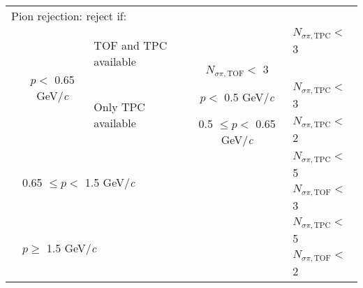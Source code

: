 \documentclass[ALICE,manyauthors]{cernphprep}
\newcommand{\Kpm}{$\mathrm{K^{\pm}}$\xspace}
\providecommand{\DIFaddtex}[1]{{\protect\color{blue}\uwave{#1}}} %
\providecommand{\DIFdeltex}[1]{{\protect\color{red}\sout{#1}}}                      %
\providecommand{\DIFaddFL}[1]{\DIFadd{#1}} %
\providecommand{\DIFdelFL}[1]{\DIFdel{#1}} %
\providecommand{\DIFaddbeginFL}{} %
\providecommand{\DIFaddendFL}{} %
\providecommand{\DIFdelbeginFL}{} %
\providecommand{\DIFdelendFL}{} %
\providecommand{\DIFadd}[1]{\texorpdfstring{\DIFaddtex{#1}}{#1}} %
\providecommand{\DIFdel}[1]{\texorpdfstring{\DIFdeltex{#1}}{}} %
\begin{document}
\begin{table}[htbp]
\begin{tabular}{lcc|c|l}
   \multicolumn{5}{l}{Pion rejection:  reject if:} \\
   \cline{2-5}
   \multirow{4}{*}{} & \multirow{4}{*}{$p <$ 0.65 GeV/\textit{c}} & \multicolumn{1}{l}{\multirow{2}{*}{TOF and TPC available}} & \multicolumn{1}{c|}{} & \DIFdelbeginFL \DIFdelFL{$N_{\sigma \pi,\mathrm{TPC}} <$ }\DIFdelendFL \DIFaddbeginFL \DIFaddFL{$N_{\sigma \uppi,\mathrm{TPC}} <$ }\DIFaddendFL 3 \\
   \multicolumn{4}{c|}{} & \DIFdelbeginFL \DIFdelFL{$N_{\sigma \pi,\mathrm{TOF}} <$ }\DIFdelendFL \DIFaddbeginFL \DIFaddFL{$N_{\sigma \uppi,\mathrm{TOF}} <$ }\DIFaddendFL 3 \\
   \cline{3-5}
   \multicolumn{2}{c}{} & \multicolumn{1}{l|}{\multirow{2}{*}{Only TPC available}} & $p <$ 0.5 GeV/\textit{c} & \DIFdelbeginFL \DIFdelFL{$N_{\sigma \pi,\mathrm{TPC}} <$ }\DIFdelendFL \DIFaddbeginFL \DIFaddFL{$N_{\sigma \uppi,\mathrm{TPC}} <$ }\DIFaddendFL 3 \\
   \cline{4-5}
   \multicolumn{3}{c|}{} & 0.5 $\leq p <$ 0.65 GeV/\textit{c} & \DIFdelbeginFL \DIFdelFL{$N_{\sigma \pi,\mathrm{TPC}} <$ }\DIFdelendFL \DIFaddbeginFL \DIFaddFL{$N_{\sigma \uppi,\mathrm{TPC}} <$ }\DIFaddendFL 2 \\
   \cline{2-5}
    & \multicolumn{3}{l|}{\multirow{2}{*}{0.65 $\leq p <$ 1.5 GeV/\textit{c}}} & \DIFdelbeginFL \DIFdelFL{$N_{\sigma \pi,\mathrm{TPC}} <$ }\DIFdelendFL \DIFaddbeginFL \DIFaddFL{$N_{\sigma \uppi,\mathrm{TPC}} <$ }\DIFaddendFL 5 \\
    \multicolumn{4}{c|}{} & \DIFdelbeginFL \DIFdelFL{$N_{\sigma \pi,\mathrm{TOF}} <$ }\DIFdelendFL \DIFaddbeginFL \DIFaddFL{$N_{\sigma \uppi,\mathrm{TOF}} <$ }\DIFaddendFL 3 \\
   \cline{2-5}
    & \multicolumn{3}{l|}{\multirow{2}{*}{$p \geq$ 1.5 GeV/\textit{c}}} & \DIFdelbeginFL \DIFdelFL{$N_{\sigma \pi,\mathrm{TPC}} <$ }\DIFdelendFL \DIFaddbeginFL \DIFaddFL{$N_{\sigma \uppi,\mathrm{TPC}} <$ }\DIFaddendFL 5 \\
    \multicolumn{4}{c|}{} & \DIFdelbeginFL \DIFdelFL{$N_{\sigma \pi,\mathrm{TOF}} <$ }\DIFdelendFL \DIFaddbeginFL \DIFaddFL{$N_{\sigma \uppi,\mathrm{TOF}} <$ }\DIFaddendFL 2 \\
   \hline
  \end{tabular}
 \label{tab:KchCuts} 
\end{table}


\end{document}
